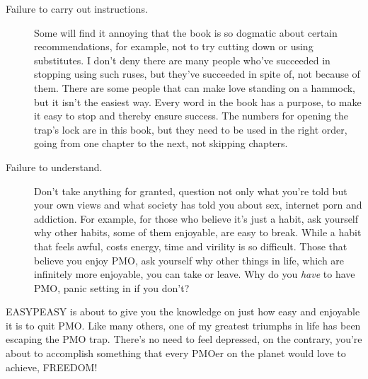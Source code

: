 \documentclass[easypeasy.tex]{subfiles}
\begin{document}
\begin{description}
  \item [Failure to carry out instructions.] Some will find it annoying that the book is so dogmatic about certain recommendations, for example, not to try cutting down or using substitutes. I don't deny there are many people who've succeeded in stopping using such ruses, but they've succeeded in spite of, not because of them. There are some people that can make love standing on a hammock, but it isn't the easiest way. Every word in the book has a purpose, to make it easy to stop and thereby ensure success. The numbers for opening the trap's lock are in this book, but they need to be used in the right order, going from one chapter to the next, not skipping chapters.

  \item [Failure to understand.] Don't take anything for granted, question not only what you're told but your own views and what society has told you about sex, internet porn and addiction. For example, for those who believe it's just a habit, ask yourself why other habits, some of them enjoyable, are easy to break. While a habit that feels awful, costs energy, time and virility is so difficult. Those that believe you enjoy PMO, ask yourself why other things in life, which are infinitely more enjoyable, you can take or leave. Why do you \textit{have} to have PMO, panic setting in if you don't?
\end{description}

EASYPEASY is about to give you the knowledge on just how easy and enjoyable it is to quit PMO. Like many others, one of my greatest triumphs in life has been escaping the PMO trap. There's no need to feel depressed, on the contrary, you're about to accomplish something that every PMOer on the planet would love to achieve, FREEDOM!
\end{document}
